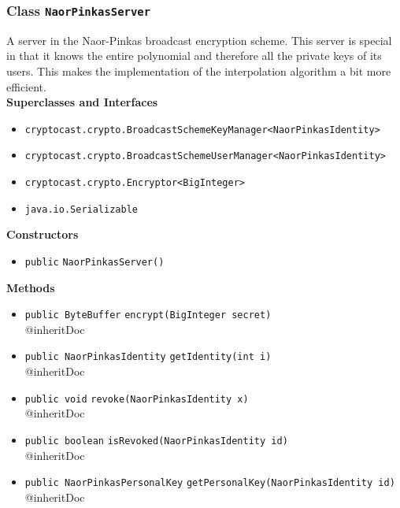 \subsubsection{Class \lstinline|NaorPinkasServer|}
A server in the Naor-Pinkas broadcast encryption scheme. This server is special in that it knows
 the entire polynomial and therefore all the private keys of its users. This makes the implementation
 of the interpolation algorithm a bit more efficient. \\


\textbf{Superclasses and Interfaces}
\begin{itemize}
\item \lstinline|cryptocast.crypto.BroadcastSchemeKeyManager<NaorPinkasIdentity>|
\item \lstinline|cryptocast.crypto.BroadcastSchemeUserManager<NaorPinkasIdentity>|
\item \lstinline|cryptocast.crypto.Encryptor<BigInteger>|
\item \lstinline|java.io.Serializable|
\end{itemize}



\textbf{Constructors}
\begin{itemize}
\item \lstinline|public| \lstinline|NaorPinkasServer|\lstinline|()|




\end{itemize}


\textbf{Methods}
\begin{itemize}
\item \lstinline|public ByteBuffer| \lstinline|encrypt|\lstinline|(BigInteger secret)|\\
{@inheritDoc}



\item \lstinline|public NaorPinkasIdentity| \lstinline|getIdentity|\lstinline|(int i)|\\
{@inheritDoc}



\item \lstinline|public void| \lstinline|revoke|\lstinline|(NaorPinkasIdentity x)|\\
{@inheritDoc}



\item \lstinline|public boolean| \lstinline|isRevoked|\lstinline|(NaorPinkasIdentity id)|\\
{@inheritDoc}



\item \lstinline|public NaorPinkasPersonalKey| \lstinline|getPersonalKey|\lstinline|(NaorPinkasIdentity id)|\\
{@inheritDoc}



\end{itemize}

